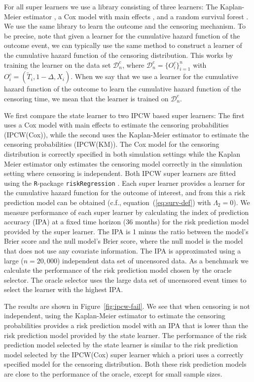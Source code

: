 \documentclass{statsoc}
\newcommand{\1}{\mathds{1}}
\newcommand{\data}{\ensuremath{\mathcal{D}}}
\begin{document}
For all super learners we use a library consisting of three learners: The
Kaplan-Meier estimator \citep{kaplan1958nonparametric,Gerds_2019prodlim}, a Cox
model with main effects \citep{cox1972regression, survival-package}, and a
random survival forest \citep{ishwaran2008random,rfsrc-paclage}. We use the same
library to learn the outcome and the censoring mechanism. To be precise, note
that given a learner for the cumulative hazard function of the outcome event, we
can typically use the same method to construct a learner of the cumulative
hazard function of the censoring distribution. This works by training the
learner on the data set \( \data_n^c \), where
\( \data_n^c = \{O_i^c\}_{i=1}^n \) with
\( O_i^c = (\tilde{T}_i, 1-\Delta, X_i) \). When we say that we use a learner
for the cumulative hazard function of the outcome to learn the cumulative hazard
function of the censoring time, we mean that the learner is trained on
\( \data_n^c \).

We first compare the state learner to two IPCW based super learners: The first
uses a Cox model with main effects to estimate the censoring probabilities
(IPCW(Cox)), while the second uses the Kaplan-Meier estimator to estimate the
censoring probabilities (IPCW(KM)). The Cox model for the censoring distribution
is correctly specified in both simulation settings while the Kaplan Meier
estimator only estimates the censoring model correctly in the simulation setting
where censoring is independent. Both IPCW super learners are fitted using the
\texttt{R}-package \texttt{riskRegression} \citep{Gerds_Ohlendorff_Ozenne_2023}.
Each super learner provides a learner for the cumulative hazard function for the
outcome of interest, and from this a risk prediction model can be obtained
(c.f., equation~(\ref{eq:surv-def}) with $\Lambda_2 = 0$). We measure
performance of each super learner by calculating the index of prediction
accuracy (IPA) \citep{kattan2018index} at a fixed time horizon (36 months) for
the risk prediction model provided by the super learner. The IPA is 1 minus the
ratio between the model's Brier score and the null model's Brier score, where
the null model is the model that does not use any covariate information. The IPA
is approximated using a large (\( n = 20,000 \)) independent data set of
uncensored data. As a benchmark we calculate the performance of the risk
prediction model chosen by the oracle selector. The oracle selector uses the
large data set of uncensored event times to select the learner with the highest
IPA.

The results are shown in Figure~\ref{fig:ipcw-fail}. We see that when censoring
is not independent, using the Kaplan-Meier estimator to estimate the censoring
probabilities provides a risk prediction model with an IPA that is lower than
the risk prediction model provided by the state learner. The performance of the
risk prediction model selected by the state learner is similar to the risk
prediction model selected by the IPCW(Cox) super learner which a priori uses a
correctly specified model for the censoring distribution. Both these risk
prediction models are close to the performance of the oracle, except for small
sample sizes.
\end{document}
